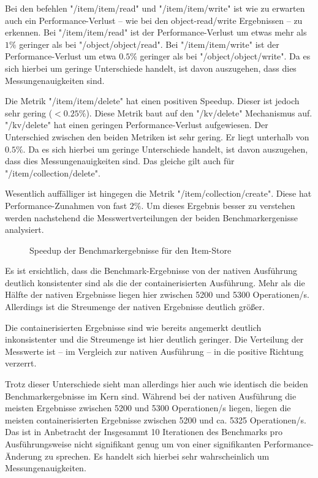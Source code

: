 Bei den befehlen "/item/item/read" und "/item/item/write" ist wie zu erwarten auch ein Performance-Verlust – wie bei den object-read/write Ergebnissen – zu erkennen. Bei "/item/item/read" ist der Performance-Verlust um etwas mehr als $1\%$ geringer als bei "/object/object/read". Bei "/item/item/write" ist der Performance-Verlust um etwa $0.5\%$ geringer als bei "/object/object/write". Da es sich hierbei um geringe Unterschiede handelt, ist davon auszugehen, dass dies Messungenauigkeiten sind. 

Die Metrik "/item/item/delete" hat einen positiven Speedup. Dieser ist jedoch sehr gering ($<0.25\%$). Diese Metrik baut auf den "/kv/delete" Mechanismus auf. "/kv/delete" hat einen geringen Performance-Verlust aufgewiesen. Der Unterschied zwischen den beiden Metriken ist sehr gering. Er liegt unterhalb von $0.5\%$. Da es sich hierbei um geringe Unterschiede handelt, ist davon auszugehen, dass dies Messungenauigkeiten sind. Das gleiche gilt auch für "/item/collection/delete".

Wesentlich auffälliger ist hingegen die Metrik "/item/collection/create". Diese hat Performance-Zunahmen von fast $2\%$. Um dieses Ergebnis besser zu verstehen werden nachstehend die Messwertverteilungen der beiden Benchmarkergenisse analysiert. 

\begin{figure}[H]
    \centering
    
    \caption{Speedup der Benchmarkergebnisse für den Item-Store}
    \label{fig:speedup_item_collection_create}
\end{figure}

\FloatBarrier

Es ist ersichtlich, dass die Benchmark-Ergebnisse von der nativen Ausführung deutlich konsistenter sind als die der containerisierten Ausführung. Mehr als die Hälfte der nativen Ergebnisse liegen hier zwischen 5200 und 5300 Operationen/s. Allerdings ist die Streumenge der nativen Ergebnisse deutlich größer. 

Die containerisierten Ergebnisse sind wie bereits angemerkt deutlich inkonsistenter und die Streumenge ist hier deutlich geringer. Die Verteilung der Messwerte ist – im Vergleich zur nativen Ausführung – in die positive Richtung verzerrt.  

Trotz dieser Unterschiede sieht man allerdings hier auch wie identisch die beiden Benchmarkergebnisse im Kern sind. Während bei der nativen Ausführung die meisten Ergebnisse zwischen 5200 und 5300 Operationen/s liegen, liegen die meisten containerisierten Ergebnisse zwischen 5200 und ca. 5325 Operationen/s. Das ist in Anbetracht der Insgesammt 10 Iterationen des Benchmarks pro Ausführungsweise nicht signifikant genug um von einer signifikanten Performance-Änderung zu sprechen. Es handelt sich hierbei sehr wahrscheinlich um Messungenauigkeiten. 


